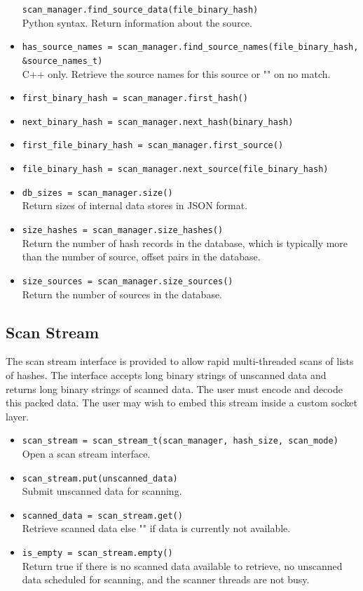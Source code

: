 \documentclass[11pt,fleqn]{article} %
\begin{document}
\begin{itemize}
\verb+scan_manager.find_source_data(file_binary_hash)+\\
Python syntax. Return information about the source.
\item \verb+has_source_names = scan_manager.find_source_names(file_binary_hash,+\\
\verb+&source_names_t)+\\
C++ only. Retrieve the source names for this source or "" on no match.
\item \verb+first_binary_hash = scan_manager.first_hash()+
\item \verb+next_binary_hash = scan_manager.next_hash(binary_hash)+
\item \verb+first_file_binary_hash = scan_manager.first_source()+
\item \verb+file_binary_hash = scan_manager.next_source(file_binary_hash)+
\item \verb+db_sizes = scan_manager.size()+\\
Return sizes of internal data stores in JSON format.
\item \verb+size_hashes = scan_manager.size_hashes()+\\
Return the number of hash records in the database, which is typically more than the number of source, offset pairs in the database.
\item \verb+size_sources = scan_manager.size_sources()+\\
Return the number of sources in the database.
\end{itemize}

\subsection{Scan Stream}
The scan stream interface is provided to allow rapid multi-threaded scans of lists of hashes. The interface accepts long binary strings of unscanned data and returns long binary strings of scanned data. The user must encode and decode this packed data. The user may wish to embed this stream inside a custom socket layer.

\begin{itemize}
\item \verb+scan_stream = scan_stream_t(scan_manager, hash_size, scan_mode)+\\
Open a scan stream interface.
\item \verb+scan_stream.put(unscanned_data)+\\
Submit unscanned data for scanning.
\item \verb+scanned_data = scan_stream.get()+\\
Retrieve scanned data else "" if data is currently not available.
\item \verb+is_empty = scan_stream.empty()+\\
Return true if there is no scanned data available to retrieve, no unscanned data scheduled for scanning, and the scanner threads are not busy.
\end{itemize}
\end{document}
